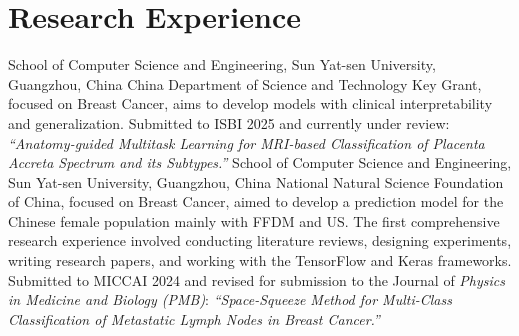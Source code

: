 \documentclass[11pt,a4paper, final]{moderncv}
\begin{document}
\section{\textbf{Research Experience}}%
	{}{}{School of Computer Science and Engineering, Sun Yat-sen University, Guangzhou, China}
	{China Department of Science and Technology Key Grant, focused on Breast Cancer, 
	aims to develop models with clinical interpretability and generalization.}
	{Submitted to ISBI 2025 and currently under review: 
	\emph{“Anatomy-guided Multitask Learning for MRI-based Classification of Placenta Accreta Spectrum and its Subtypes.”}}
	{}{}{School of Computer Science and Engineering, Sun Yat-sen University, Guangzhou, China}
	{National Natural Science Foundation of China, focused on Breast Cancer, 
	aimed to develop a prediction model for the Chinese female population mainly with FFDM and US.}
	{The first comprehensive research experience involved conducting literature reviews, designing experiments, 
	writing research papers, and working with the TensorFlow and Keras frameworks.}
	{Submitted to MICCAI 2024 and revised for submission to the Journal of \emph{Physics in Medicine and Biology (PMB)}: 
	\emph{“Space-Squeeze Method for Multi-Class Classification of Metastatic Lymph Nodes in Breast Cancer.”}}
\end{document}
